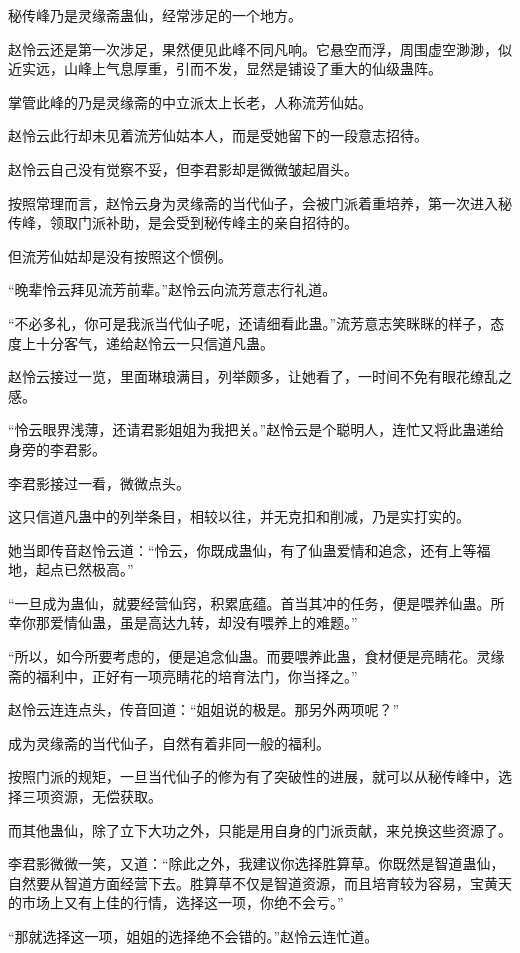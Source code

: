 \begin{this_body}
秘传峰乃是灵缘斋蛊仙，经常涉足的一个地方。

赵怜云还是第一次涉足，果然便见此峰不同凡响。它悬空而浮，周围虚空渺渺，似近实远，山峰上气息厚重，引而不发，显然是铺设了重大的仙级蛊阵。

掌管此峰的乃是灵缘斋的中立派太上长老，人称流芳仙姑。

赵怜云此行却未见着流芳仙姑本人，而是受她留下的一段意志招待。

赵怜云自己没有觉察不妥，但李君影却是微微皱起眉头。

按照常理而言，赵怜云身为灵缘斋的当代仙子，会被门派着重培养，第一次进入秘传峰，领取门派补助，是会受到秘传峰主的亲自招待的。

但流芳仙姑却是没有按照这个惯例。

“晚辈怜云拜见流芳前辈。”赵怜云向流芳意志行礼道。

“不必多礼，你可是我派当代仙子呢，还请细看此蛊。”流芳意志笑眯眯的样子，态度上十分客气，递给赵怜云一只信道凡蛊。

赵怜云接过一览，里面琳琅满目，列举颇多，让她看了，一时间不免有眼花缭乱之感。

“怜云眼界浅薄，还请君影姐姐为我把关。”赵怜云是个聪明人，连忙又将此蛊递给身旁的李君影。

李君影接过一看，微微点头。

这只信道凡蛊中的列举条目，相较以往，并无克扣和削减，乃是实打实的。

她当即传音赵怜云道：“怜云，你既成蛊仙，有了仙蛊爱情和追念，还有上等福地，起点已然极高。”

“一旦成为蛊仙，就要经营仙窍，积累底蕴。首当其冲的任务，便是喂养仙蛊。所幸你那爱情仙蛊，虽是高达九转，却没有喂养上的难题。”

“所以，如今所要考虑的，便是追念仙蛊。而要喂养此蛊，食材便是亮睛花。灵缘斋的福利中，正好有一项亮睛花的培育法门，你当择之。”

赵怜云连连点头，传音回道：“姐姐说的极是。那另外两项呢？”

成为灵缘斋的当代仙子，自然有着非同一般的福利。

按照门派的规矩，一旦当代仙子的修为有了突破性的进展，就可以从秘传峰中，选择三项资源，无偿获取。

而其他蛊仙，除了立下大功之外，只能是用自身的门派贡献，来兑换这些资源了。

李君影微微一笑，又道：“除此之外，我建议你选择胜算草。你既然是智道蛊仙，自然要从智道方面经营下去。胜算草不仅是智道资源，而且培育较为容易，宝黄天的市场上又有上佳的行情，选择这一项，你绝不会亏。”

“那就选择这一项，姐姐的选择绝不会错的。”赵怜云连忙道。


\end{this_body}
